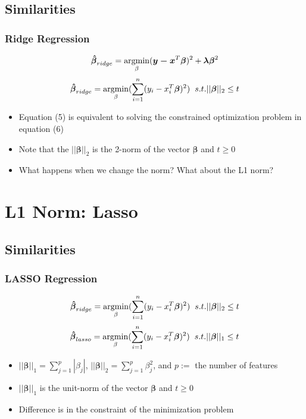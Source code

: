 \documentclass[]{beamer}
\newcommand{\argmin}{\operatornamewithlimits{argmin}}
\begin{document}
\subsection{Similarities}
\begin{frame}
\frametitle{Ridge Regression}   %
\begin{equation}
\boldsymbol{\hat{\beta}}_{ridge} = \argmin_{\beta} (\boldsymbol{y - x}^{T} \boldsymbol{\beta})^2 + \boldsymbol{\lambda \beta}^2
\end{equation}
\begin{equation}
\boldsymbol{\hat{\beta}}_{ridge} = \argmin_{\beta}( \sum_{i=1}^{n} (y_i-x_{i}^T \boldsymbol{\beta})^2) \hspace{0.2cm} s.t. ||\boldsymbol{\beta}||_2 \le t
\end{equation}
\begin{itemize}
\item<1-> Equation (5) is equivalent to solving the constrained optimization problem in equation (6)
\item<2-> Note that the $||\boldsymbol{\beta}||_2$ is the 2-norm of the vector $\boldsymbol{\beta}$ and $t \ge 0$
  \item<3-> What happens when we change the norm? What about the L1 norm?
\end{itemize}
\end{frame}

\section{L1 Norm: Lasso}
\subsection{Similarities}
\begin{frame}
\frametitle{LASSO Regression}   %
\begin{equation}
\boldsymbol{\hat{\beta}}_{ridge} = \argmin_{\beta}( \sum_{i=1}^{n} (y_i-x_{i}^T \boldsymbol{\beta})^2) \hspace{0.2cm} s.t. ||\boldsymbol{\beta}||_2 \le t
\end{equation}
\begin{equation}
\boldsymbol{\hat{\beta}}_{lasso} = \argmin_{\beta}( \sum_{i=1}^{n} (y_i-x_{i}^T \boldsymbol{\beta})^2) \hspace{0.2cm} s.t. ||\boldsymbol{\beta}||_1 \le t
\end{equation}
\begin{itemize}
\item<1-> $||\boldsymbol{\beta}||_1 = \sum_{j=1}^{p}|\beta_j|$, $||\boldsymbol{\beta}||_2 = \sum_{j=1}^{p}\beta_j^2$, and $p:=$ the number of features
\item<2-> $||\boldsymbol{\beta}||_1$ is the unit-norm of the vector $\boldsymbol{\beta}$ and $t \ge 0$ 
  \item<3-> Difference is in the constraint of the minimization problem
\end{itemize}
\end{frame}
\end{document}
